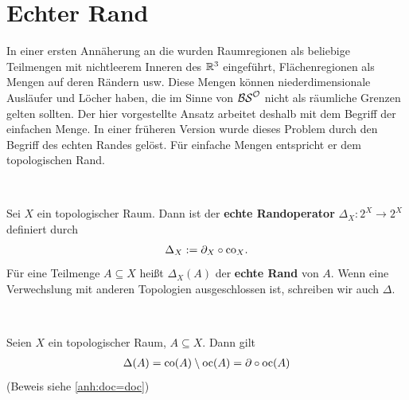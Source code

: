 \section{Echter Rand}\label{sec:echter-rand}
    In einer ersten Annäherung an die \strukt wurden Raumregionen als beliebige Teilmengen mit nichtleerem Inneren des $\mathbb{R}^3$ eingeführt, Flächenregionen als Mengen auf deren Rändern usw.
    Diese Mengen können niederdimensionale Ausläufer und Löcher haben, die im Sinne von $\mathcal{BS}^{\mathcal{O}}$ nicht als räumliche Grenzen gelten sollten. 
    Der hier vorgestellte Ansatz arbeitet deshalb mit dem Begriff der einfachen Menge. 
    In einer früheren Version wurde dieses Problem durch den Begriff des echten Randes gelöst.
    Für einfache Mengen entspricht er dem topologischen Rand.
%
    \begin{dfn}\label{def:echtR} \ \vspace{8pt}

        \noindent
        Sei $X$ ein topologischer Raum. Dann ist der \textbf{echte Randoperator} $\Delta_X : 2^X \to 2^X$ definiert durch
        \begin{align*}
            \Delta_X := \partial_X \circ \text{co}_X.
        \end{align*}
        Für eine Teilmenge $A \subseteq X$ heißt $\Delta_X(A)$ der \textbf{echte Rand} von $A$. Wenn eine Verwechslung mit anderen Topologien ausgeschlossen ist, schreiben wir auch $\Delta$.
        
    \end{dfn}
%
    \begin{satz} \label{satz:dco=doc} \ \vspace{8pt}

        \noindent
        Seien $X$ ein topologischer Raum, $A \subseteq X$. Dann gilt
        \begin{align*}
            \Delta(A) = \text{co}(A) \setminus \text{oc}(A) = \partial \circ \text{oc}(A)
        \end{align*}
        (Beweis siehe \ref{anh:doc=doc})
    \end{satz}
    
    
